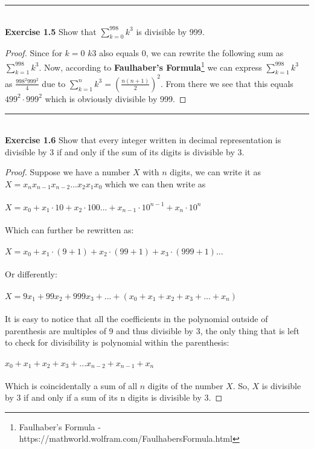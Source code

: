 \documentclass[a4paper]{article}
\begin{document}
\noindent\rule{12cm}{0.4pt}\\
\noindent \textbf{Exercise 1.5} Show that $\sum_{k=0}^{998} k^3$ is divisible by 999.
\begin{proof}
Since for $k=0$ $k3$ also equals 0, we can rewrite the following sum as $\sum_{k=1}^{998} k^3$. Now, according to \textbf{Faulhaber's Formula}\footnote{Faulhaber's Formula - https://mathworld.wolfram.com/FaulhabersFormula.html} we can express $\sum_{k=1}^{998} k^3$ as $\frac{998^2 999^2}{4}$ due to $\sum_{k=1}^{n} k^3=\left( \frac{n(n+1)}{2}\right)^2$. From there we see that this equals $499^2 \cdot 999^2$ which is obviously divisible by 999.
\end{proof}




\noindent\rule{12cm}{0.4pt}\\
\noindent \textbf{Exercise 1.6} Show that every integer written in decimal representation is divisible by 3 if and only if the sum of its digits is divisible by 3.
\begin{proof}
Suppose we have a number $X$ with $n$ digits, we can write it as $X=x_n x_{n-1}x_{n-2}...x_2x_1x_0$ which we can then write as \\\\
 $X=x_0+x_1 \cdot 10 + x_2 \cdot 100 ... + x_{n-1} \cdot 10^{n-1} + x_n \cdot 10^n$ \\\\
 Which can further be rewritten as: \\\\
 $X = x_0 + x_1 \cdot (9 + 1) + x_2 \cdot (99 + 1) + x_3 \cdot (999 + 1)...$\\\\
 Or differently: \\\\
 $X = 9x_1 + 99x_2 + 999x_3 + ... + (x_0 + x_1 + x_2 + x_3 + ... + x_n)$ \\\\
 It is easy to notice that all the coefficients in the polynomial outside of parenthesis are multiples of 9 and thus divisible by 3, the only thing that is left to check for divisibility is polynomial within the parenthesis: \\\\
 $ x_0 + x_1 + x_2 + x_3 + ... x_{n-2} + x_{n-1} + x_n$ \\\\
 Which is coincidentally a sum of all $n$ digits of the number $X$. So, $X$ is divisible by 3 if and only if a sum of its n digits is divisible by 3. 
\end{proof}
\end{document}
